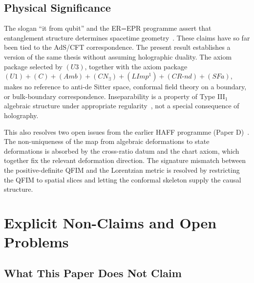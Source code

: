 \documentclass[12pt]{article}
\theoremstyle{definition}
\theoremstyle{remark}
\begin{document}
\subsection{Physical Significance}\label{physical-significance}

The slogan ``it from qubit'' and the ER=EPR programme assert that
entanglement structure determines spacetime geometry~\cite{Maldacena1999,RyuTakayanagi2006,VanRaamsdonk2010,Maldacena2013}. These claims have
so far been tied to the AdS/CFT correspondence. The present result
establishes a version of the same thesis without assuming holographic
duality. The axiom package
selected by \((U3)\), together with the axiom package
\((U1)+(C)+(Amb)+(CN_\exists)+(LImp^1)+(CR\text{-}nd)+(SFa)\), makes
no reference to anti-de Sitter space, conformal field theory on a
boundary, or bulk-boundary correspondence. Inseparability is a property
of Type III\(_1\) algebraic structure under appropriate
regularity~\cite{Witten2018}, not
a special consequence of holography.

This also resolves two open issues from the earlier HAFF programme
(Paper D)~\cite{Liu2026PaperD}. The non-uniqueness of the map from algebraic deformations to
state deformations is absorbed by the cross-ratio datum and the chart
axiom, which together fix the relevant deformation direction. The
signature mismatch between the positive-definite QFIM and the Lorentzian
metric is resolved by restricting the QFIM to spatial slices and letting
the conformal skeleton supply the causal structure.

\section{Explicit Non-Claims and Open
Problems}\label{explicit-non-claims-and-open-problems}

\subsection{What This Paper Does Not
Claim}\label{what-this-paper-does-not-claim}
\end{document}

